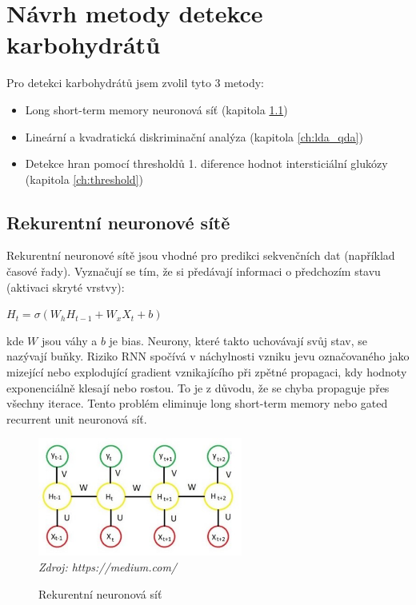 \chapter{Návrh metody detekce karbohydrátů}

Pro detekci karbohydrátů jsem zvolil tyto 3 metody:
\begin{itemize}
\setlength\itemsep{0em}
\item Long short-term memory neuronová síť (kapitola \ref{ch:lstm})
\item Lineární a kvadratická diskriminační analýza (kapitola \ref{ch:lda_qda})
\item Detekce hran pomocí thresholdů 1. diference hodnot intersticiální glukózy \\(kapitola \ref{ch:threshold})
\end{itemize}

\section{Rekurentní neuronové sítě}
\label{ch:lstm}

Rekurentní neuronové sítě jsou vhodné pro predikci sekvenčních dat (například časové řady). Vyznačují se tím, že si předávají informaci o předchozím stavu (aktivaci skryté vrstvy):

$H_{t}=\sigma (W_{h}H_{t-1}+W_{x}X_{t}+b)$

\noindent kde $W$ jsou váhy a $b$ je bias. Neurony, které takto uchovávají svůj stav, se nazývají buňky. Riziko RNN spočívá v náchylnosti vzniku jevu označovaného jako mizející nebo explodující gradient vznikajícího při zpětné propagaci, kdy hodnoty exponenciálně klesají nebo rostou. To je z důvodu, že se chyba propaguje přes všechny iterace. Tento problém eliminuje long short-term memory nebo gated recurrent unit neuronová síť.

\begin{figure}[H]
\caption{Rekurentní neuronová síť}
\label{fig:rnn}
\centering
\includegraphics[width=0.6\textwidth]{img/cho/rnn.jpeg}\\
\textit{Zdroj: https://medium.com/}
\end{figure}


